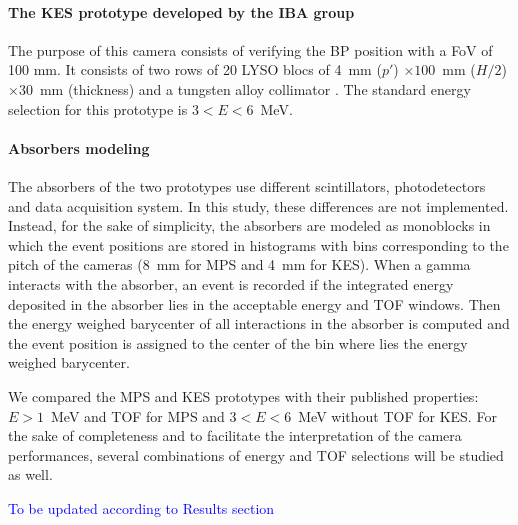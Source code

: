 \documentclass[a4paper,english,12pt]{article}
\newcommand{\et}[2][blue]{\textcolor{#1}{#2}}
\begin{document}
\paragraph{The KES prototype developed by the IBA group}

The purpose of this camera consists of verifying the BP position with a FoV of 100 mm. It consists of two rows of 20 LYSO blocs of 4~mm ($p'$) $\times 100$~mm ($H/2$) $\times30$~mm (thickness) and a tungsten alloy collimator \citep{Perali2014,Sterpin2015}. The standard energy selection for this prototype is $3<E<6$~MeV.

\paragraph{Absorbers modeling}

The absorbers of the two prototypes use different scintillators, photodetectors and data acquisition system. In this study, these differences are not implemented. Instead, for the sake of simplicity, the absorbers are modeled as monoblocks in which the event positions are stored in histograms with bins corresponding to the pitch of the cameras (8~mm for MPS and 4~mm for KES). When a gamma interacts with the absorber, an event is recorded if the integrated energy deposited in the absorber lies in the acceptable energy and TOF windows. Then the energy weighed barycenter of all interactions in the absorber is computed and the event position is assigned to the center of the bin where lies the energy weighed barycenter.

We compared the MPS and KES prototypes with their published properties: $E>1$~MeV and TOF for MPS and $3<E<6$~MeV without TOF for KES. For the sake of completeness and to facilitate the interpretation of the camera performances, several combinations of energy and TOF selections will be studied as well. 

\et{To be updated according to Results section}
\end{document}
